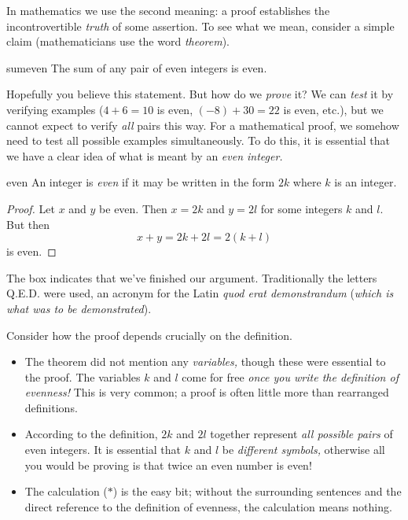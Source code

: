 In mathematics we use the second meaning: a proof establishes the incontrovertible \emph{truth} of some assertion. To see what we mean, consider a simple claim (mathematicians use the word \emph{theorem}).

\begin{thm}{}{sumeven}
	The sum of any pair of even integers is even.
\end{thm}

Hopefully you believe this statement. But how do we \emph{prove} it? We can \emph{test} it by verifying examples ($4+6=10$ is even, $(-8)+30=22$ is even, etc.), but we cannot expect to verify \emph{all} pairs this way. For a mathematical proof, we somehow need to test all possible examples simultaneously. To do this, it is essential that we have a clear idea of what is meant by an \emph{even integer.}

\begin{defn}{}{even}
	An integer is \emph{even} if it may be written in the form $2k$ where $k$ is an integer.
\end{defn}

\begin{proof}
	Let $x$ and $y$ be even. Then $x=2k$ and $y=2l$ for some integers $k$ and $l$. But then
	\[x+y=2k+2l=2(k+l)\tag{$\ast$}\]
	is even.
\end{proof}

The box \smash{\raisebox{8pt}{$\qedsymbol$}} indicates that we've finished our argument. Traditionally the letters Q.E.D.{} were used, an acronym for the Latin \emph{quod erat demonstrandum} (\emph{which is what was to be demonstrated}).\smallbreak

Consider how the proof depends crucially on the definition.

\begin{itemize}\itemsep0pt
	\item The theorem did not mention any \emph{variables,} though these were essential to the proof. The variables $k$ and $l$ come for free \emph{once you write the definition of evenness!} This is very common; a proof is often little more than rearranged definitions.
	\item According to the definition, $2k$ and $2l$ together represent \emph{all possible pairs} of even integers. It is essential that $k$ and $l$ be \emph{different symbols,} otherwise all you would be proving is that twice an even number is even!
	\item The calculation ($\ast$) is the easy bit; without the surrounding sentences and the direct reference to the definition of evenness, the calculation means nothing.
\end{itemize}

